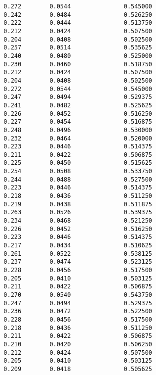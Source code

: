 \documentclass[
  letterpaper,
  DIV=11,
  numbers=noendperiod]{scrartcl}
\begin{document}
\begin{verbatim}
  0.272        0.0544               0.545000              
  0.242        0.0484               0.526250              
  0.222        0.0444               0.513750              
  0.212        0.0424               0.507500              
  0.204        0.0408               0.502500              
  0.257        0.0514               0.535625              
  0.240        0.0480               0.525000              
  0.230        0.0460               0.518750              
  0.212        0.0424               0.507500              
  0.204        0.0408               0.502500              
  0.272        0.0544               0.545000              
  0.247        0.0494               0.529375              
  0.241        0.0482               0.525625              
  0.226        0.0452               0.516250              
  0.227        0.0454               0.516875              
  0.248        0.0496               0.530000              
  0.232        0.0464               0.520000              
  0.223        0.0446               0.514375              
  0.211        0.0422               0.506875              
  0.225        0.0450               0.515625              
  0.254        0.0508               0.533750              
  0.244        0.0488               0.527500              
  0.223        0.0446               0.514375              
  0.218        0.0436               0.511250              
  0.219        0.0438               0.511875              
  0.263        0.0526               0.539375              
  0.234        0.0468               0.521250              
  0.226        0.0452               0.516250              
  0.223        0.0446               0.514375              
  0.217        0.0434               0.510625              
  0.261        0.0522               0.538125              
  0.237        0.0474               0.523125              
  0.228        0.0456               0.517500              
  0.205        0.0410               0.503125              
  0.211        0.0422               0.506875              
  0.270        0.0540               0.543750              
  0.247        0.0494               0.529375              
  0.236        0.0472               0.522500              
  0.228        0.0456               0.517500              
  0.218        0.0436               0.511250              
  0.211        0.0422               0.506875              
  0.210        0.0420               0.506250              
  0.212        0.0424               0.507500              
  0.205        0.0410               0.503125              
  0.209        0.0418               0.505625              

\end{verbatim}
\end{document}
